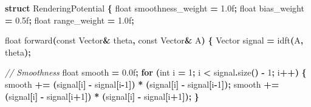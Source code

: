 \documentclass[
  11pt,
  a4paper,
]{article}
\newenvironment{Shaded}{\begin{snugshade}}{\end{snugshade}}
\newcommand{\AttributeTok}[1]{\textcolor[rgb]{0.13,0.29,0.53}{#1}}
\newcommand{\BuiltInTok}[1]{#1}
\newcommand{\CommentTok}[1]{\textcolor[rgb]{0.56,0.35,0.01}{\textit{#1}}}
\newcommand{\ControlFlowTok}[1]{\textcolor[rgb]{0.13,0.29,0.53}{\textbf{#1}}}
\newcommand{\DataTypeTok}[1]{\textcolor[rgb]{0.13,0.29,0.53}{#1}}
\newcommand{\DecValTok}[1]{\textcolor[rgb]{0.00,0.00,0.81}{#1}}
\newcommand{\FloatTok}[1]{\textcolor[rgb]{0.00,0.00,0.81}{#1}}
\newcommand{\KeywordTok}[1]{\textcolor[rgb]{0.13,0.29,0.53}{\textbf{#1}}}
\newcommand{\NormalTok}[1]{#1}
\newcommand{\OperatorTok}[1]{\textcolor[rgb]{0.81,0.36,0.00}{\textbf{#1}}}
\begin{document}
\begin{Shaded}
\begin{Highlighting}[]
\KeywordTok{struct}\NormalTok{ RenderingPotential }\OperatorTok{\{}
    \DataTypeTok{float}\NormalTok{ smoothness\_weight }\OperatorTok{=} \FloatTok{1.0}\BuiltInTok{f}\OperatorTok{;}
    \DataTypeTok{float}\NormalTok{ bias\_weight }\OperatorTok{=} \FloatTok{0.5}\BuiltInTok{f}\OperatorTok{;}
    \DataTypeTok{float}\NormalTok{ range\_weight }\OperatorTok{=} \FloatTok{1.0}\BuiltInTok{f}\OperatorTok{;}
    
    \DataTypeTok{float}\NormalTok{ forward}\OperatorTok{(}\AttributeTok{const}\NormalTok{ Vector}\OperatorTok{\&}\NormalTok{ theta}\OperatorTok{,} \AttributeTok{const}\NormalTok{ Vector}\OperatorTok{\&}\NormalTok{ A}\OperatorTok{)} \OperatorTok{\{}
\NormalTok{        Vector signal }\OperatorTok{=}\NormalTok{ idft}\OperatorTok{(}\NormalTok{A}\OperatorTok{,}\NormalTok{ theta}\OperatorTok{);}
        
        \CommentTok{// Smoothness}
        \DataTypeTok{float}\NormalTok{ smooth }\OperatorTok{=} \FloatTok{0.0}\BuiltInTok{f}\OperatorTok{;}
        \ControlFlowTok{for} \OperatorTok{(}\DataTypeTok{int}\NormalTok{ i }\OperatorTok{=} \DecValTok{1}\OperatorTok{;}\NormalTok{ i }\OperatorTok{\textless{}}\NormalTok{ signal}\OperatorTok{.}\NormalTok{size}\OperatorTok{()} \OperatorTok{{-}} \DecValTok{1}\OperatorTok{;}\NormalTok{ i}\OperatorTok{++)} \OperatorTok{\{}
\NormalTok{            smooth }\OperatorTok{+=} \OperatorTok{(}\NormalTok{signal}\OperatorTok{[}\NormalTok{i}\OperatorTok{]} \OperatorTok{{-}}\NormalTok{ signal}\OperatorTok{[}\NormalTok{i}\OperatorTok{{-}}\DecValTok{1}\OperatorTok{])} \OperatorTok{*} \OperatorTok{(}\NormalTok{signal}\OperatorTok{[}\NormalTok{i}\OperatorTok{]} \OperatorTok{{-}}\NormalTok{ signal}\OperatorTok{[}\NormalTok{i}\OperatorTok{{-}}\DecValTok{1}\OperatorTok{]);}
\NormalTok{            smooth }\OperatorTok{+=} \OperatorTok{(}\NormalTok{signal}\OperatorTok{[}\NormalTok{i}\OperatorTok{]} \OperatorTok{{-}}\NormalTok{ signal}\OperatorTok{[}\NormalTok{i}\OperatorTok{+}\DecValTok{1}\OperatorTok{])} \OperatorTok{*} \OperatorTok{(}\NormalTok{signal}\OperatorTok{[}\NormalTok{i}\OperatorTok{]} \OperatorTok{{-}}\NormalTok{ signal}\OperatorTok{[}\NormalTok{i}\OperatorTok{+}\DecValTok{1}\OperatorTok{]);}
        \OperatorTok{\}}
        

\end{Highlighting}
\end{Shaded}
\end{document}
